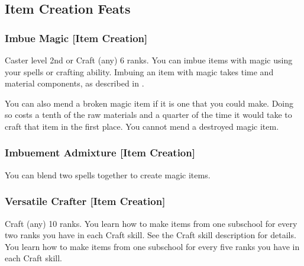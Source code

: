 \subsection{Item Creation Feats}

\subsubsection{Imbue Magic [Item Creation]}
 Caster level 2nd or Craft (any) 6 ranks.
 You can imbue items with magic using your spells or crafting ability. Imbuing an item with magic takes time and material components, as described in .

You can also mend a broken magic item if it is one that you could make. Doing so costs a tenth of the raw materials and a quarter of the time it would take to craft that item in the first place. You cannot mend a destroyed magic item.

\subsubsection{Imbuement Admixture [Item Creation]}
 You can blend two spells together to create magic items. 

\subsubsection{Versatile Crafter [Item Creation]}
 Craft (any) 10 ranks.
 You learn how to make items from one subschool for every two ranks you have in each Craft skill. See the Craft skill description for details.
 You learn how to make items from one subschool for every five ranks you have in each Craft skill.
